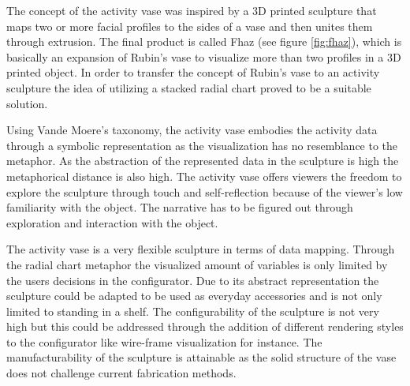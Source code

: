 \documentclass[../medieninformatik-arbeit.tex]{subfiles}
\begin{document}
The concept of the activity vase was inspired by a 3D printed sculpture that maps two or more facial profiles to the sides of a vase and then unites them through extrusion. The final product is called Fhaz (see figure \ref{fig:fhaz}), which is basically an expansion of Rubin's vase \cite{rubin1921visuell} to visualize more than two profiles in a 3D printed object. In order to transfer the concept of Rubin's vase to an activity sculpture the idea of utilizing a stacked radial chart proved to be a suitable solution.

Using Vande Moere's taxonomy, the activity vase embodies the activity data through a symbolic representation as the visualization has no resemblance to the metaphor. As the abstraction of the represented data in the sculpture is high the metaphorical distance is also high. The activity vase offers viewers the freedom to explore the sculpture through touch and self-reflection because of the viewer's low familiarity with the object. The narrative has to be figured out through exploration and interaction with the object.

The activity vase is a very flexible sculpture in terms of data mapping. Through the radial chart metaphor the visualized amount of variables is only limited by the users decisions in the configurator. Due to its abstract representation the sculpture could be adapted to be used as everyday accessories and is not only limited to standing in a shelf. The configurability of the sculpture is not very high but this could be addressed through the addition of different rendering styles to the configurator like wire-frame visualization for instance. The manufacturability of the sculpture is attainable as the solid structure of the vase does not challenge current fabrication methods. 
\end{document}
